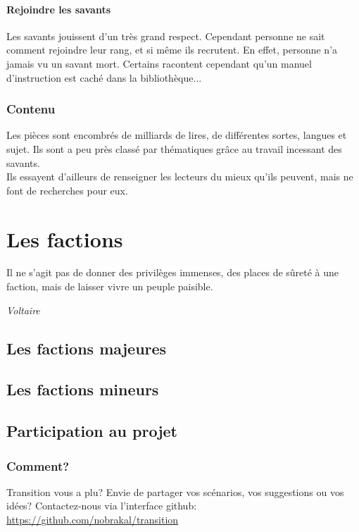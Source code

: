 \documentclass{book}
\begin{document}
\subsubsection{Rejoindre les savants}
Les savants jouissent d'un très grand respect. Cependant personne ne sait comment rejoindre leur rang, et si même ils recrutent. En effet, personne n'a jamais vu un savant mort. Certains racontent cependant qu'un manuel d'instruction est caché dans la bibliothèque...
\subsection{Contenu}
Les pièces sont encombrés de milliards de lires, de différentes sortes, langues et sujet. Ils sont a peu près classé par thématiques grâce au travail incessant des savants.\\
Ils essayent d'ailleurs de renseigner les lecteurs du mieux qu'ils peuvent, mais ne font de recherches pour eux.


\chapter{Les factions}
\epigraph{Il ne s'agit pas de donner des privilèges immenses, des places de sûreté à une faction, mais de laisser vivre un peuple paisible.}{\textit{Voltaire}}
\section{Les factions majeures}
\section{Les factions mineurs}


\newpage
\section{Participation au projet}
\subsection{Comment?}
\hypertarget{participation}{}
Transition vous a plu? 
Envie de partager vos scénarios, vos suggestions ou vos idées?
\newline
Contactez-nous via l'interface github: \href {https://github.com/nobrakal/transition} {https://github.com/nobrakal/transition}
\end{document}
